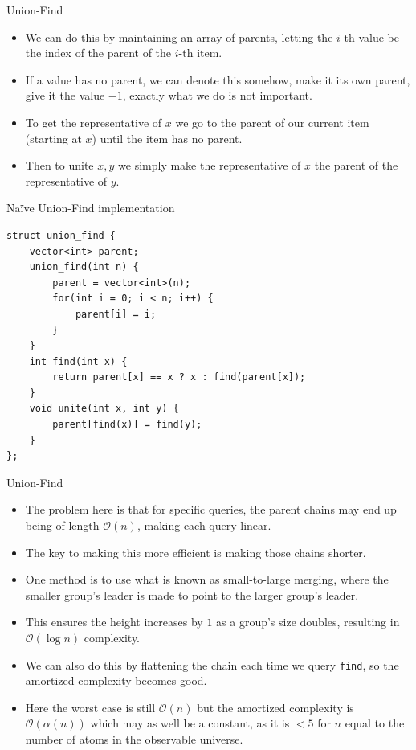 \documentclass{beamer}
\begin{document}
\begin{frame}[plain]{Union-Find}
    \begin{itemize}
        \item<1-> We can do this by maintaining an array of parents, letting the $i$-th value be the index of the parent of the $i$-th item.
        \item<2-> If a value has no parent, we can denote this somehow, make it its own parent, give it the value $-1$, exactly what we do is not important.
        \item<3-> To get the representative of $x$ we go to the parent of our current item (starting at $x$) until the item has no parent.
        \item<4-> Then to unite $x, y$ we simply make the representative of $x$ the parent of the representative of $y$.
    \end{itemize}
\end{frame}

\begin{frame}{Naïve Union-Find implementation}
    \begin{verbatim}
struct union_find {
    vector<int> parent;
    union_find(int n) {
        parent = vector<int>(n);
        for(int i = 0; i < n; i++) {
            parent[i] = i;
        }
    }
    int find(int x) {
        return parent[x] == x ? x : find(parent[x]);
    }
    void unite(int x, int y) {
        parent[find(x)] = find(y);
    }
};
    \end{verbatim}
\end{frame}

\begin{frame}[plain]{Union-Find}
    \begin{itemize}
        \item<1-> The problem here is that for specific queries, the parent chains may end up being of length $\mathcal{O}(n)$, making each query linear.
        \item<2-> The key to making this more efficient is making those chains shorter.
        \item<3-> One method is to use what is known as small-to-large merging, where the smaller group's leader is made to point to the larger group's leader.
        \item<4-> This ensures the height increases by $1$ as a group's size doubles, resulting in $\mathcal{O}(\log n)$ complexity.
        \item<5-> We can also do this by flattening the chain each time we query \texttt{find}, so the amortized complexity becomes good.
        \item<6-> Here the worst case is still $\mathcal{O}(n)$ but the amortized complexity is $\mathcal{O}(\alpha(n))$ which may as well be a constant, as it is $<5$ for $n$ equal to the number of atoms in the observable universe.
    \end{itemize}
\end{frame}
\end{document}
